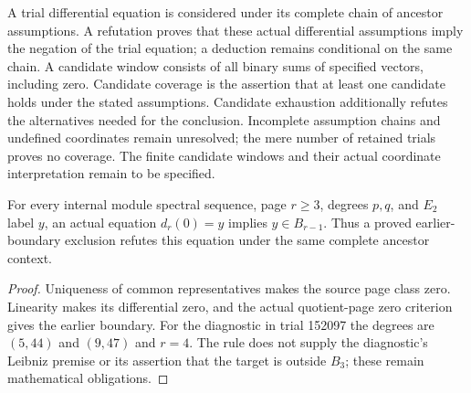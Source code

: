 \begin{definition}
  \label{def:lin-conditional-branches}
  \notready
  A trial differential equation is considered under its complete chain
  of ancestor assumptions. A refutation proves that these actual
  differential assumptions imply the negation of the trial equation;
  a deduction remains conditional on the same chain.
  A candidate window consists of all binary sums of specified vectors,
  including zero. Candidate coverage is the assertion that at least
  one candidate holds under the stated assumptions. Candidate exhaustion
  additionally refutes the alternatives needed for the conclusion.
  Incomplete assumption chains and undefined coordinates remain
  unresolved; the mere number of retained trials proves no coverage.
  The finite candidate windows and their actual coordinate interpretation
  remain to be specified.
\end{definition}

\begin{lemma}
  \label{lem:lin-zero-source-refutation}
  \leanok
  For every internal module spectral sequence, page $r\ge3$, degrees
  $p,q$, and $E_2$ label $y$, an actual equation $d_r(0)=y$ implies
  $y\in B_{r-1}$. Thus a proved earlier-boundary exclusion refutes this
  equation under the same complete ancestor context.
\end{lemma}
\begin{proof}
  \leanok
  Uniqueness of common representatives makes the source page class zero.
  Linearity makes its differential zero, and the actual quotient-page
  zero criterion gives the earlier boundary. For the diagnostic in trial
  152097 the degrees are $(5,44)$ and $(9,47)$ and $r=4$. The rule does not
  supply the diagnostic's Leibniz premise or its assertion that the target
  is outside $B_3$; these remain mathematical obligations.
\end{proof}

